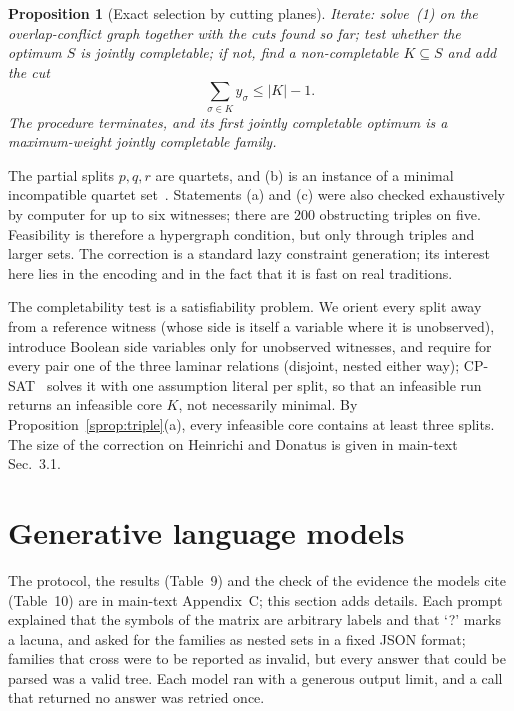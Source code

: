 \documentclass[11pt,a4paper]{article}
\newtheorem{proposition}[theorem]{Proposition}
\theoremstyle{remark}
\begin{document}
\begin{proposition}[Exact selection by cutting planes]\label{sthm:cutting}
Iterate: solve~(1) on the overlap-conflict graph together with the cuts found so far; test whether the optimum $S$ is jointly completable; if not, find a non-completable $K\subseteq S$ and add the cut
\begin{equation*}
\textstyle\sum_{\sigma\in K}y_\sigma\le|K|-1 .
\end{equation*}
The procedure terminates, and its first jointly completable optimum is a maximum-weight jointly completable family.
\end{proposition}

The partial splits $p,q,r$ are quartets, and (b) is an instance of a minimal incompatible quartet set~\citep{Shutters2013}. Statements (a) and (c) were also checked exhaustively by computer for up to six witnesses; there are 200 obstructing triples on five. Feasibility is therefore a hypergraph condition, but only through triples and larger sets. The correction is a standard lazy constraint generation; its interest here lies in the encoding and in the fact that it is fast on real traditions.

The completability test is a satisfiability problem. We orient every split away from a reference witness (whose side is itself a variable where it is unobserved), introduce Boolean side variables only for unobserved witnesses, and require for every pair one of the three laminar relations (disjoint, nested either way); CP-SAT~\citep{ORTools} solves it with one assumption literal per split, so that an infeasible run returns an infeasible core $K$, not necessarily minimal. By Proposition~\ref{sprop:triple}(a), every infeasible core contains at least three splits. The size of the correction on Heinrichi and Donatus is given in main-text Sec.~3.1.

\section{Generative language models}
\label{app:llm}
The protocol, the results (Table~9) and the check of the evidence the models cite (Table~10) are in main-text Appendix~C; this section adds details. Each prompt explained that the symbols of the matrix are arbitrary labels and that `?' marks a lacuna, and asked for the families as nested sets in a fixed JSON format; families that cross were to be reported as invalid, but every answer that could be parsed was a valid tree. Each model ran with a generous output limit, and a call that returned no answer was retried once.
\end{document}
